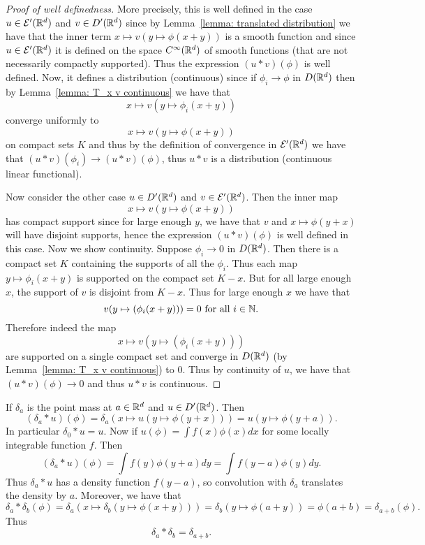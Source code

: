 \documentclass[twoside, a4paper, 10pt]{amsart}
\begin{document}
\begin{proof}[Proof of well definedness] More precisely, this is well defined in the case $u \in \mathcal{E}'(\mathbb{R}^d)$ and $v \in D'(\mathbb{R}^d)$ since by Lemma~\ref{lemma: translated distribution} we have that the inner term $x \mapsto v(y \mapsto \phi(x+y))$ is a smooth function and since $u \in \mathcal{E}'(\mathbb{R}^d)$ it is defined on the space $C^{\infty}(\mathbb{R}^d)$ of smooth functions (that are not necessarily compactly supported). Thus the expression $(u * v)(\phi)$ is well defined. Now, it defines a distribution (continuous) since if $\phi_i \to \phi$ in $D(\mathbb{R}^d)$ then by Lemma~\ref{lemma: T_x v continuous} we have that $$x \mapsto v(y \mapsto \phi_i(x+y))$$ converge uniformly to $$x \mapsto v(y \mapsto \phi(x+y))$$ on compact sets $K$ and thus by the definition of convergence in $\mathcal{E}'(\mathbb{R}^d)$ we have that $(u * v)(\phi_i) \to (u*v)(\phi)$, thus $u * v$ is a distribution (continuous linear functional).

Now consider the other case $u \in D'(\mathbb{R}^d)$ and $v \in \mathcal{E}'(\mathbb{R}^d)$. Then the inner map $$x \mapsto v(y \mapsto \phi(x+y))$$ has compact support since for large enough $y$, we have that $v$ and $x \mapsto \phi(y+x)$ will have disjoint supports, hence the expression $(u * v)(\phi)$ is well defined in this case. Now we show continuity. Suppose $\phi_i \to 0$ in $D(\mathbb{R}^d)$. Then there is a compact set $K$ containing the supports of all the $\phi_i$. Thus each map $y \mapsto \phi_i(x+y)$ is supported on the compact set $K-x$. But for all large enough $x$, the support of $v$ is disjoint from $K-x$. Thus for large enough $x$ we have that $$v(y \mapsto (\phi_i (x+y))) = 0 \text{ for all } i \in \mathbb{N}.$$ Therefore indeed the map $$x \mapsto v(y \mapsto (\phi_i (x+y)))$$ are supported on a single compact set and converge in $D(\mathbb{R}^d)$ (by Lemma~\ref{lemma: T_x v continuous}) to $0$. Thus by continuity of $u$, we have that $(u*v)(\phi) \to 0$ and thus $u*v$ is continuous. \end{proof}

\begin{eg} If $\delta_a$ is the point mass at $a \in \mathbb{R}^d$ and $u \in D'(\mathbb{R}^d)$. Then $$(\delta_a * u)(\phi) = \delta_a(x \mapsto u(y \mapsto \phi(y+x))) = u(y \mapsto \phi(y+a)).$$ In particular $\delta_0 * u = u$. Now if $u(\phi) = \int f(x) \phi(x) dx$ for some locally integrable function $f$. Then $$(\delta_a * u)(\phi) = \int f(y)\phi(y+a) dy = \int f(y-a)\phi(y) dy.$$ Thus $\delta_a * u$ has a density function $f(y-a)$, so convolution with $\delta_a$ translates the density by $a$. Moreover, we have that $$\delta_a * \delta_b (\phi) = \delta_a(x \mapsto \delta_b(y \mapsto \phi(x+y))) = \delta_b (y \mapsto \phi(a+y)) = \phi(a+b) = \delta_{a+b}(\phi).$$ Thus $$\delta_a * \delta_b = \delta_{a+b}.$$

\end{eg}
\end{document}

